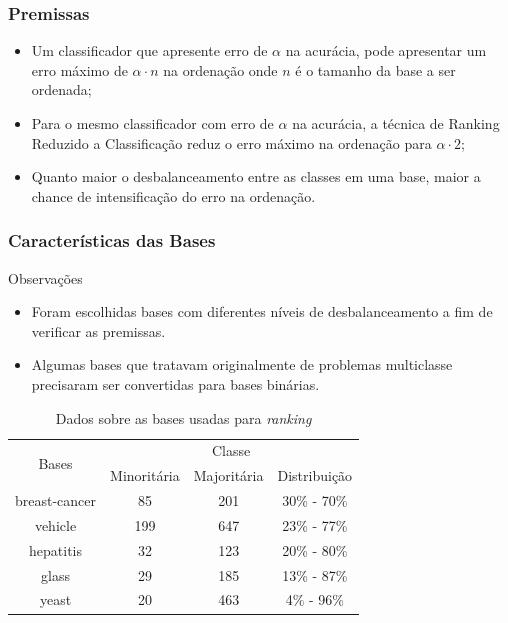 \begin{frame}
    \frametitle{Premissas}

    \begin{itemize}
        \item Um classificador que apresente erro de $\alpha$ na acurácia, pode apresentar um erro máximo de $\alpha \cdot n$ na ordenação onde $n$ é o tamanho da base a ser ordenada;
        \item Para o mesmo classificador com erro de $\alpha$ na acurácia, a técnica de Ranking Reduzido a Classificação reduz o erro máximo na ordenação para $\alpha \cdot 2$;
        \item Quanto maior o desbalanceamento entre as classes em uma base, maior a chance de intensificação do erro na ordenação.
    \end{itemize}
\end{frame}

\begin{frame}
    \frametitle{Características das Bases}
    
    \begin{block}{Observações}
        \begin{itemize}
            \item Foram escolhidas bases com diferentes níveis de desbalanceamento a fim de verificar as premissas.
            \item Algumas bases que tratavam originalmente de problemas multiclasse precisaram ser convertidas para bases binárias.
        \end{itemize}
    \end{block}

    \begin{table}[H]
    
        \begin{tabular}{c c c c}
            \hline
            \multirow{2}{*}{Bases} & \multicolumn{3}{c}{Classe} \\ \cline{2-4}
            & {\small Minoritária} & {\small Majoritária} & {\small Distribuição}\\
            \hline
            breast-cancer & 85 & 201 & 30\% - 70\%\\
            vehicle & 199 & 647 & 23\% - 77\%\\
            hepatitis & 32 & 123 & 20\% - 80\%\\
            glass & 29 & 185 & 13\% - 87\%\\
            yeast & 20 & 463 & 4\% - 96\%\\
            \hline
        \end{tabular}
    
        \caption{Dados sobre as bases usadas para \emph{ranking}}
    \end{table}
\end{frame}

